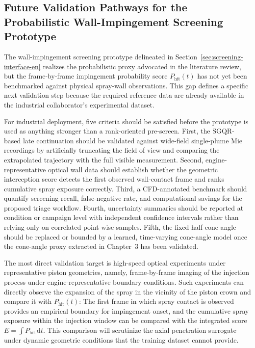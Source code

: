 \subsection{Future Validation Pathways for the Probabilistic Wall-Impingement Screening Prototype}
\label{sec:future-validation-pathways-en}

The wall-impingement screening prototype delineated in Section~\ref{sec:screening-interface-en} realizes the probabilistic proxy advocated in the literature review, but the frame-by-frame impingement probability score \(P_{\mathrm{hit}}(t)\) has not yet been benchmarked against physical spray-wall observations.
This gap defines a specific next validation step because the required reference data are already available in the industrial collaborator's experimental dataset.

For industrial deployment, five criteria should be satisfied before the prototype is used as anything stronger than a rank-oriented pre-screen.
First, the \(\mathrm{SGQR}\)-based late continuation should be validated against wide-field single-plume Mie recordings by artificially truncating the field of view and comparing the extrapolated trajectory with the full visible measurement.
Second, engine-representative optical wall data should establish whether the geometric interception score detects the first observed wall-contact frame and ranks cumulative spray exposure correctly.
Third, a CFD-annotated benchmark should quantify screening recall, false-negative rate, and computational savings for the proposed triage workflow.
Fourth, uncertainty summaries should be reported at condition or campaign level with independent confidence intervals rather than relying only on correlated point-wise samples.
Fifth, the fixed half-cone angle should be replaced or bounded by a learned, time-varying cone-angle model once the cone-angle proxy extracted in Chapter~3 has been validated.

The most direct validation target is high-speed optical experiments under representative piston geometries, namely, frame-by-frame imaging of the injection process under engine-representative boundary conditions.
Such experiments can directly observe the expansion of the spray in the vicinity of the piston crown and compare it with \(P_{\mathrm{hit}}(t)\):
The first frame in which spray contact is observed provides an empirical boundary for impingement onset, and the cumulative spray exposure within the injection window can be compared with the integrated score \(E = \int P_{\mathrm{hit}}\,\mathrm{d}t\).
This comparison will scrutinize the axial penetration surrogate under dynamic geometric conditions that the training dataset cannot provide.

